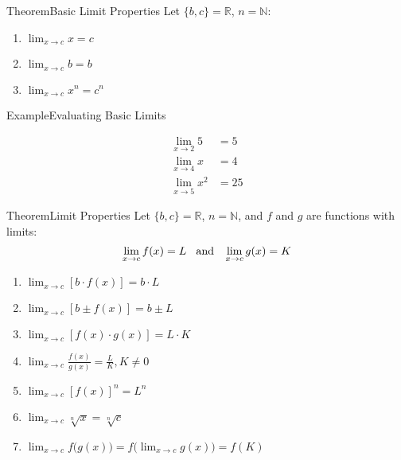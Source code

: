 \documentclass{MathNotes}
\newenvironment{example}[1]{\begin{BlueBox}{Example}{#1}}{\end{BlueBox}}
\newenvironment{theorem}[1]{\begin{GrayBox}{Theorem}{#1}}{\end{GrayBox}}
\begin{document}
\begin{multicols}{2}[]
	\begin{theorem}{Basic Limit Properties}
		Let $\{b, c\}=\mathbb{R}$, $n=\mathbb{N}$:

		\begin{enumerate}
			\item $\lim_{x\to c}x=c$
			\item $\lim_{x\to c}b=b$
			\item $\lim_{x\to c}x^n=c^n$
		\end{enumerate}
	\end{theorem}

	\begin{example}{Evaluating Basic Limits}
		\begin{center}
			\begin{align*}
				\lim_{x\to 2}5   & =5  \\
				\lim_{x\to 4}x   & =4  \\
				\lim_{x\to 5}x^2 & =25
			\end{align*}
		\end{center}
	\end{example}
\end{multicols}

\newpage
{}
\begin{theorem}{Limit Properties}
	Let $\{b, c\}=\mathbb{R}$, $n=\mathbb{N}$, and $f$ and $g$ are functions
	with limits:
	\begin{displaymath}
		\lim_{x\to c}f(x)=L\hspace{2ex}\text{and}\hspace{2ex}\lim_{x\to c}g(x)=K
	\end{displaymath}

	\begin{enumerate}
		\item $\lim_{x\to c}[ b\cdot f(x) ]=b\cdot L$
		\item $\lim_{x\to c}[ b\pm f(x) ]=b\pm L$
		\item $\lim_{x\to c}[ f(x)\cdot g(x) ]=L\cdot K$
		\item $\lim_{x\to c}\frac{f(x)}{g(x)}=\frac{L}{K}, K\neq 0$
		\item $\lim_{x\to c}[ f(x)] ^n=L^n$
		\item $\lim_{x\to c}\sqrt[n]x=\sqrt[n]{c}$
		\item $\lim_{x\to c}f\bigl(g(x)\bigr)=f\bigl(\lim_{x\to c}g(x)\bigr)=f(K)$
	\end{enumerate}
\end{theorem}
\end{document}
